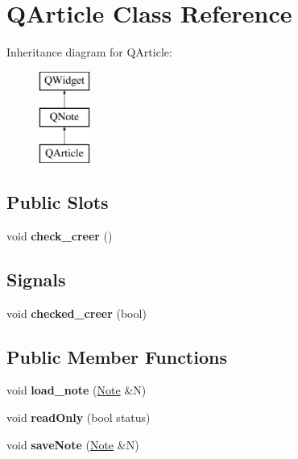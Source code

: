 \hypertarget{class_q_article}{}\section{Q\+Article Class Reference}
\label{class_q_article}
Inheritance diagram for Q\+Article\+:\begin{figure}[H]
\begin{center}
\leavevmode
\includegraphics[height=3.000000cm]{class_q_article}
\end{center}
\end{figure}
\subsection*{Public Slots}
\begin{DoxyCompactItemize}
\item 
\mbox{\label{class_q_article_a1d1a9f629113e6135bce19a9c84b03e9}} 
void {\bfseries check\+\_\+creer} ()
\end{DoxyCompactItemize}
\subsection*{Signals}
\begin{DoxyCompactItemize}
\item 
\mbox{\label{class_q_article_a73232df813fe69c96a47ddf43a04c0ad}} 
void {\bfseries checked\+\_\+creer} (bool)
\end{DoxyCompactItemize}
\subsection*{Public Member Functions}
\begin{DoxyCompactItemize}
\item 
\mbox{\label{class_q_article_aea21c10581abe74709317283739e9552}} 
void {\bfseries load\+\_\+note} (\hyperlink{class_note}{Note} \&N)
\item 
\mbox{\label{class_q_article_af6c14f4ce3df750a0e1a22207309068e}} 
void {\bfseries read\+Only} (bool status)
\item 
\mbox{\label{class_q_article_ae59d03688947d16b86f9ab10384894ec}} 
void {\bfseries save\+Note} (\hyperlink{class_note}{Note} \&N)
\end{DoxyCompactItemize}

